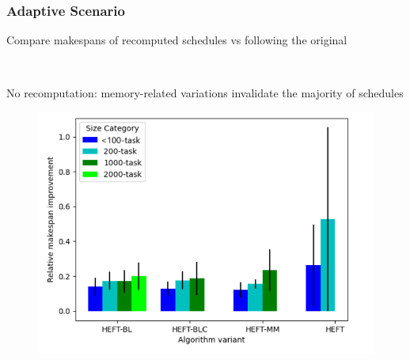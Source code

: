 \documentclass[xcolor=svgnames,titlepage,english,presentation]{beamer}
\begin{document}
\begin{frame}
    \frametitle{Adaptive Scenario}

    \vspace{-1cm}

    Compare makespans of recomputed schedules vs following the original

    ~~~~

    No recomputation: memory-related variations invalidate the majority of schedules

    \pause
   
      
        \begin{figure}
            \centering
            \includegraphics[scale=0.3]{diagrams/images/MsImprovDynamicCCGRID.png}
          
        \end{figure}
   
\end{frame}
\end{document}
